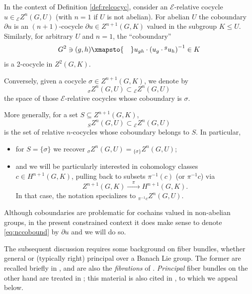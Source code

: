 \documentclass[pdftex]{sigma}
\numberwithin{equation}{section}
\newcommand\cE{{\mathcal E}}
\begin{document}
\begin{Notation}\label{not:relsigma}
 In the context of Definition \ref{def:relcocyc}, consider an $\cE$-relative cocycle $u\in {}_{\cE}Z^n(G,U)$ (with $n=1$ if $U$ is not abelian). For abelian $U$ the coboundary $\partial u$ is an $(n+1)$-cocycle $ \partial u\in Z^{n+1}(G,K)$ valued in the subgroup $K\le U$. Similarly, for arbitrary $U$ and $n=1$, the ``coboundary''
 \begin{equation}\label{eq:nccobound}
 G^2\ni (g,h)\xmapsto{\quad} u_{gh}\cdot \left(u_g\cdot {}^g u_h\right)^{-1}\in K
 \end{equation}
 is a 2-cocycle in $Z^2(G,K)$.

 Conversely, given a cocycle $\sigma\in Z^{n+1}(G,K)$, we denote by
 \begin{equation*}
 {}_{\sigma}Z^{n}(G,U)\subset {}_{\cE}Z^n(G,U)
 \end{equation*}
 the space of those $\cE$-relative cocycles whose coboundary is $\sigma$.

 More generally, for a set $S\subseteq Z^{n+1}(G,K)$,
 \begin{equation*}
 {}_{S}Z^{n}(G,U)\subset {}_{\cE}Z^n(G,U)
 \end{equation*}
 is the set of relative $n$-cocycles whose coboundary belongs to $S$. In particular,
 \begin{itemize}\itemsep=0pt
 \item for $S=\{\sigma\}$ we recover ${}_{\sigma}Z^{n}(G,U)
 =
 {}_{\{\sigma\}}Z^{n}(G,U)$;
 \item and we will be particularly interested in cohomology classes $c\in H^{n+1}(G,K)$, pulling back to subsets $\pi^{-1}(c)$ \big(or $\pi^{-1}c$\big) via
 \begin{equation*}
 Z^{n+1}(G,K)\xrightarrow{\quad\pi\quad}H^{n+1}(G,K).
 \end{equation*}
 In that case, the notation specializes to ${}_{\pi^{-1}c}Z^{n}(G,U)$.
 \end{itemize}
\end{Notation}

\begin{Remark}\label{re:nccobound}
 Although coboundaries are problematic for cochains valued in non-abelian groups, in the present constrained context it does make sense to denote \eqref{eq:nccobound} by $\partial u$ and we will do so.
\end{Remark}

The subsequent discussion requires some background on fiber bundles, whether general or (typically right) principal over a Banach Lie group. The former are recalled briefly in \cite[Section~IV.3]{lang-fund}, and are also the {\it fibrations} of \cite[Section~6.1]{bourb-vars-17}. {\it Principal} fiber bundles on the other hand are treated in \cite[Section~6.2]{bourb-vars-17}; this material is also cited in \cite[Section~III.1]{bourb-lie-13}, to which we appeal below.
\end{document}
